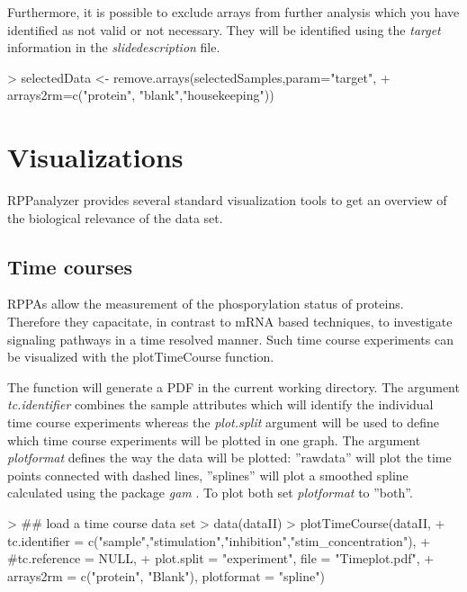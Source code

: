 \documentclass[12pt]{article}
\newcommand{\Rfunarg}[1]{{\textit{#1}}}
\begin{document}
Furthermore, it is possible to exclude arrays from further analysis which you have identified as not valid or
not necessary. They will be identified using the \Rfunarg{target} information in the \emph{slidedescription} file.

\begin{Schunk}
\begin{Sinput}
> selectedData <-   remove.arrays(selectedSamples,param="target",
+                   arrays2rm=c("protein", "blank","housekeeping"))
\end{Sinput}
\end{Schunk}

\section{Visualizations}

RPPanalyzer provides several standard visualization tools to get an overview of
the biological relevance of the data set.


\subsection{Time courses}

RPPAs allow the measurement of the phosporylation status of proteins. Therefore they capacitate, in contrast to mRNA based techniques, to investigate signaling pathways in a time resolved manner. Such time course experiments can be visualized with the plotTimeCourse function.

The function will generate a PDF in the current working directory. The argument \Rfunarg{tc.identifier} combines the sample attributes which will identify the individual time course experiments whereas the \Rfunarg{plot.split} argument will be used to define which time course experiments will be plotted in one graph. The argument \Rfunarg{plotformat} defines the way the data will be plotted: ''rawdata'' will plot the time points connected with dashed lines, ''splines'' will plot a smoothed spline calculated using the package \emph{gam} \citep{gam}. To plot both set \Rfunarg{plotformat} to ''both''.

\begin{Schunk}
\begin{Sinput}
> ## load a time course data set
> data(dataII)
> plotTimeCourse(dataII,
+ tc.identifier = c("sample","stimulation","inhibition","stim_concentration"),
+ #tc.reference = NULL,
+ plot.split = "experiment", file = "Timeplot.pdf",
+ arrays2rm = c("protein", "Blank"), plotformat = "spline")
\end{Sinput}
\end{Schunk}
\end{document}
